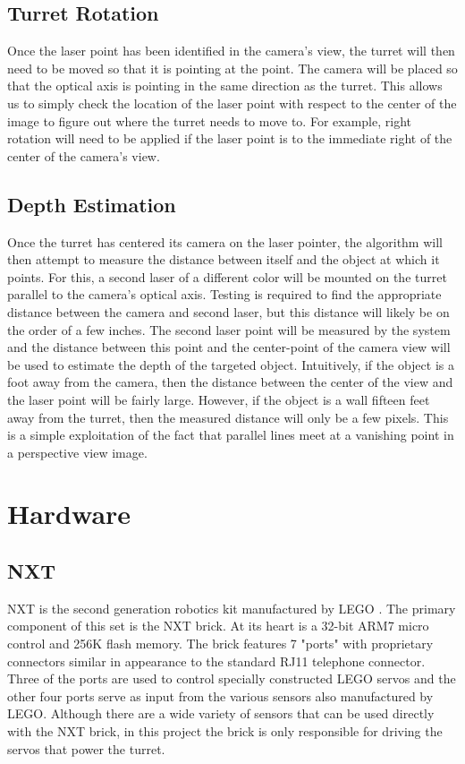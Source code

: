 \documentclass[10pt,twocolumn,letterpaper]{article}
\begin{document}
\subsection{Turret Rotation}

Once the laser point has been identified in the camera's view, the turret will then need to be moved so that it is pointing at the point. The camera will be placed so that the optical axis is pointing in the same direction as the turret. This allows us to simply check the location of the laser point with respect to the center of the image to figure out where the turret needs to move to. For example, right rotation will need to be applied if the laser point is to the immediate right of the center of the camera's view.




\subsection{Depth Estimation}

Once the turret has centered its camera on the laser pointer, the algorithm will then attempt to measure the distance between itself and the object at which it points.  For this, a second laser of a different color will be mounted on the turret parallel to the camera's optical axis.  Testing is required to find the appropriate distance between the camera and second laser, but this distance will likely be on the order of a few inches.  The second laser point will be measured by the system and the distance between this point and the center-point of the camera view will be used to estimate the depth of the targeted object.  Intuitively, if the object is a foot away from the camera, then the distance between the center of the view and the laser point will be fairly large.  However, if the object is a wall fifteen feet away from the turret, then the measured distance will only be a few pixels.  This is a simple exploitation of the fact that parallel lines meet at a vanishing point in a perspective view image. 

\section{Hardware}

\subsection{NXT}
NXT is the second generation robotics kit manufactured by LEGO \cite{nxt}. The primary component of this set is the NXT brick. At its heart is a 32-bit ARM7 micro control and 256K flash memory. The brick features 7 "ports" with proprietary connectors similar in appearance to the standard RJ11 telephone connector. Three of the ports are used to control specially constructed LEGO servos and the other four ports serve as input from the various sensors also manufactured by LEGO. Although there are a wide variety of sensors that can be used directly with the NXT brick, in this project the brick is only responsible for driving the servos that power the turret.
\end{document}
